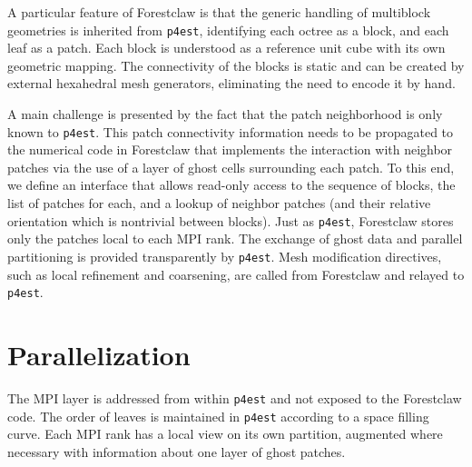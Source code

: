\documentclass{IOS-Book-Article}     %
\newcommand{\forestclaw}{Forestclaw\xspace}
\newcommand{\pforest}{\texttt{p4est}\xspace}
\begin{document}
A particular feature of \forestclaw is that the generic handling of multiblock
geometries is inherited from \pforest, identifying each octree as a block, and
each leaf as a patch.  Each block is understood as a reference unit cube with
its own geometric mapping.  The connectivity of the blocks is static and can be
created by external hexahedral mesh generators, eliminating the need to encode
it by hand.

A main challenge is presented by the fact that the patch neighborhood
is only known to \pforest.  This patch connectivity information needs
to be propagated to the numerical code in \forestclaw that implements
the interaction with neighbor patches via the use of a layer of ghost
cells surrounding each patch.  To this end, we define an interface
that allows read-only access to the sequence of blocks,
the list of patches for each, and a lookup of neighbor patches (and
their relative orientation which is nontrivial between blocks).
Just as \pforest, \forestclaw stores only the patches local to each
MPI rank.  The
exchange of ghost data and parallel partitioning is provided
transparently by \pforest.  Mesh modification directives, such as
local refinement and coarsening, are called from \forestclaw and
relayed to \pforest.








\section{Parallelization}

The MPI layer is addressed from within \pforest and not exposed to the
\forestclaw code.  The order of leaves is maintained in \pforest according to a
space filling curve.  Each MPI rank has a local view on its own partition,
augmented where necessary with information about one layer of ghost patches.
\end{document}

